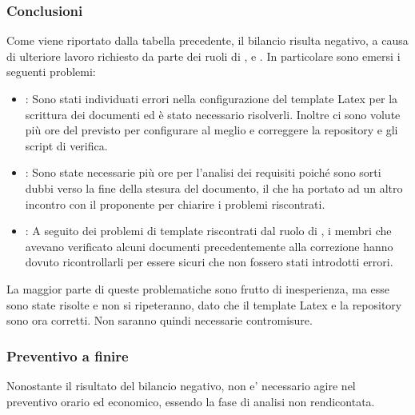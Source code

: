 \subsubsection{Conclusioni}
Come viene riportato dalla tabella precedente, il bilancio risulta negativo, a causa di ulteriore lavoro richiesto da parte dei ruoli di \ammProg{}, \analProg{} e \verifProg{}. In particolare sono emersi i seguenti problemi:
\begin{itemize}
\item \textbf{\ammProg{}}: Sono stati individuati errori nella configurazione del template Latex per la scrittura dei documenti ed è stato necessario risolverli. Inoltre ci sono volute più ore del previsto per configurare al meglio e correggere la repository e gli script di verifica.
\item \textbf{\analProg{}}: Sono state necessarie più ore per l'analisi dei requisiti poiché sono sorti dubbi verso la fine della stesura del documento, il che ha portato ad un altro incontro con il proponente per chiarire i problemi riscontrati.
\item \textbf{\verifProg{}}: A seguito dei problemi di template riscontrati dal ruolo di \ammProg{}, i membri che avevano verificato alcuni documenti precedentemente alla correzione hanno dovuto ricontrollarli per essere sicuri che non fossero stati introdotti errori.
\end{itemize}

La maggior parte di queste problematiche sono frutto di inesperienza, ma esse sono state risolte e non si ripeteranno, dato che il template Latex e la repository sono ora corretti. Non saranno quindi necessarie contromisure.

\subsubsection{Preventivo a finire}
Nonostante il risultato del bilancio negativo, non e' necessario agire nel preventivo orario ed economico, essendo la fase di analisi non rendicontata.

